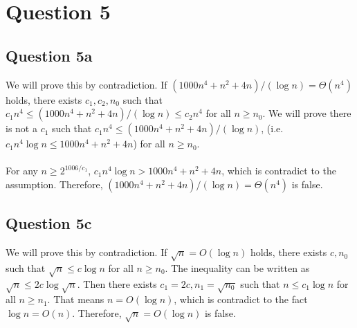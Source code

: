 \documentclass[11pt]{article}
\begin{document}
\section{Question 5}
\label{q5}
\subsection{Question 5a}
\label{q5a}
We will prove this by contradiction. If $(1000n^4 + n^2 + 4n)/(\log n) = \Theta(n^4)$ holds, there exists $c_1, c_2, n_0$ such that $c_1 n^4 \leq (1000n^4 + n^2 + 4n)/(\log n) \leq c_2 n^4$ for all $n \geq n_0$. We will prove there is not a $c_1$ such that $c_1 n^4 \leq (1000n^4 + n^2 + 4n)/(\log n)$, (i.e. $c_1 n^4 \log n \leq 1000n^4 + n^2 + 4n$) for all $n \geq n_0$.\\\\
For any $n \geq 2^{1006 / c_1}$, $c_1 n^4 \log n > 1000n^4 + n^2 + 4n$, which is contradict to the assumption. Therefore, $(1000n^4 + n^2 + 4n)/(\log n) = \Theta(n^4)$ is false.


\subsection{Question 5c}
\label{q5c}
We will prove this by contradiction. If $\sqrt{n} = O(\log n)$ holds, there exists $c, n_0$ such that $\sqrt{n} \leq c \log n$ for all $n \geq n_0$. The inequality can be written as $\sqrt{n} \leq 2c \log \sqrt{n}$. Then there exists $c_1 = 2c, n_1 = \sqrt{n_0}$ such that $n \leq c_1 \log n$ for all $n \geq n_1$. That means $n = O(\log n)$, which is contradict to the fact $\log n = O(n)$. Therefore, $\sqrt{n} = O(\log n)$ is false.
\end{document}
